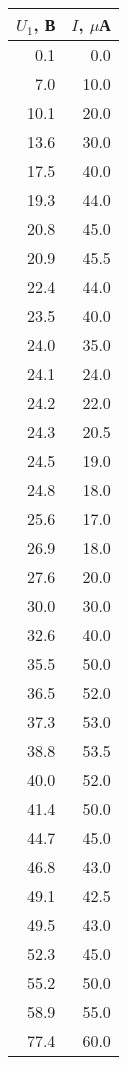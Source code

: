 \begin{tabular}{rr}
\toprule
     $U_1$, В &     $I$, $\mu$А \\
\midrule
   0.1 &    0.0 \\
   7.0 &   10.0 \\
  10.1 &   20.0 \\
  13.6 &   30.0 \\
  17.5 &   40.0 \\
  19.3 &   44.0 \\
  20.8 &   45.0 \\
  20.9 &   45.5 \\
  22.4 &   44.0 \\
  23.5 &   40.0 \\
  24.0 &   35.0 \\
  24.1 &   24.0 \\
  24.2 &   22.0 \\
  24.3 &   20.5 \\
  24.5 &   19.0 \\
  24.8 &   18.0 \\
  25.6 &   17.0 \\
  26.9 &   18.0 \\
  27.6 &   20.0 \\
  30.0 &   30.0 \\
  32.6 &   40.0 \\
  35.5 &   50.0 \\
  36.5 &   52.0 \\
  37.3 &   53.0 \\
  38.8 &   53.5 \\
  40.0 &   52.0 \\
  41.4 &   50.0 \\
  44.7 &   45.0 \\
  46.8 &   43.0 \\
  49.1 &   42.5 \\
  49.5 &   43.0 \\
  52.3 &   45.0 \\
  55.2 &   50.0 \\
  58.9 &   55.0 \\
  77.4 &   60.0 \\
\bottomrule
\end{tabular}
